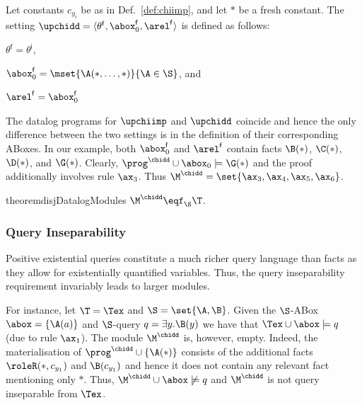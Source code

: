 \begin{definition} \label{def:chidd} %
  Let constants $c_{y_i}$ be as in Def.\ \ref{def:chiimp},
  and let $*$ be a fresh constant. The setting
  $\upchidd=\langle \theta^{\mathsf{f}}, \abox_0^{\mathsf{f}}, \arel^{\mathsf{f}} \rangle$ is defined as follows:
  \begin{inparaenum}[\it (i)]
  \item $\theta^{\mathsf{f}} = \theta^{\mathsf{i}}$,
  \item $\abox_0^{\mathsf{f}} = \mset{\A(\ast,\ldots,\ast)}{\A\in\S}$, and
  \item $\arel^{\mathsf{f}} = \abox_0^{\mathsf{f}}$\qedhere
  \end{inparaenum}
\end{definition}
%
The datalog programs for $\upchiimp$ and  $\upchidd$ coincide
and hence the only difference between the two settings is in the definition of
their corresponding ABoxes.  In our example, both
$\abox_0^{\mathsf{f}}$ and $\arel^{\mathsf{f}}$ contain facts
$\B(\ast)$, $\C(\ast)$, $\D(\ast)$, and $\G(\ast)$. Clearly,
$\prog^{\chidd} \cup \abox_0 \models \G(\ast)$ and the 
proof additionally involves rule $\ax_3$. Thus $\M^{\chidd} = \set{\ax_3,\ax_4,\ax_5,\ax_6}$.

\begin{restatable}{theorem}{disjDatalogModules}
\label{thm:disjDatalogModules}
$\M^{\chidd}\eqf_{\S}\T$.
\end{restatable}
%

\subsubsection{Query Inseparability}
Positive existential queries constitute a much richer query 
language than facts as they
allow for existentially quantified variables. 
Thus, the
query inseparability requirement  invariably 
leads to larger modules.

For instance, let $\T=\Tex$ and
$\S=\set{\A,\B}$. Given the $\S$-ABox
$\abox = \{\A(a)\}$ and $\S$-query $q = \exists y.\B(y)$ we have that
$\Tex \cup \abox \models q$ (due to rule $\ax_1$). 
The module
$\M^{\chidd}$ is, however, empty. Indeed, the materialisation 
of $\prog^{\chidd} \cup \{\A(\ast)\}$ consists of the additional facts
$\roleR(\ast,c_{y_1})$ and $\B(c_{y_1})$ and hence it does not
contain any relevant fact mentioning only $\ast$.
Thus, 
$\M^{\chidd} \cup \abox \not\models q$ and $\M^{\chidd}$ is not
query inseparable from $\Tex$.

